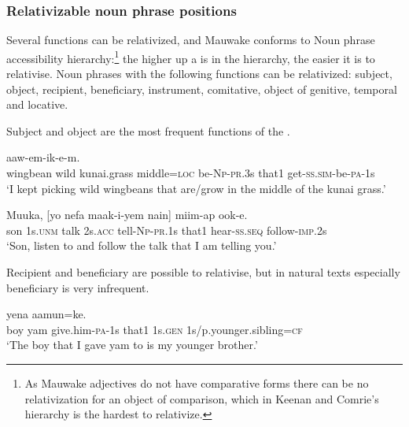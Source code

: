 \subsubsection{Relativizable noun phrase positions}

Several  functions can be relativized, and Mauwake conforms to  Noun phrase accessibility hierarchy:\footnote{As Mauwake adjectives do not have comparative forms there can be no relativization for an object of comparison, which in Keenan and Comrie's hierarchy is the hardest to relativize.}  the higher up a  is in the hierarchy, the easier it is to relativise. Noun phrases with the following functions can be relativized: subject, object, recipient, beneficiary, instrument, comitative, object of genitive, temporal and locative. 

Subject  and object  are the most frequent functions of the .

\ea%
\label{ex:8:x1537}
\gll [\textstyleEmphasizedVernacularWords{Mesa}  \textstyleEmphasizedVernacularWords{asia}  fiker(a)  gone=pa  ika-i-ya  nain] aaw-em-ik-e-m.\\
wingbean  wild  kunai.grass  middle=\textsc{loc} be-\textsc{Np}-\textsc{pr}.3s that1 get-\textsc{ss}.\textsc{sim}-be-\textsc{pa}-1s\\
\glt`I kept picking wild wingbeans that are/grow in the middle of the kunai grass.'
\z


\ea%
\label{ex:8:x1538}
\gll Muuka,  [yo    nefa  maak-i-yem  nain]  miim-ap ook-e.\\
son  1s.\textsc{unm} talk 2s.\textsc{acc} tell-\textsc{Np}-\textsc{pr}.1s that1 hear-\textsc{ss}.\textsc{seq} follow-\textsc{imp}.2s\\
\glt`Son, listen to and follow the talk that I am telling you.'
\z


Recipient  and beneficiary  are possible to relativise, but in natural texts especially beneficiary is very infrequent.

\ea%
\label{ex:8:x1539}
  yena  aamun=ke.\\
boy  yam  give.him-\textsc{pa}-1s that1 1s.\textsc{gen} 1s/p.younger.sibling=\textsc{cf}\\
\glt`The boy that I gave yam to is my younger brother.'
\z


